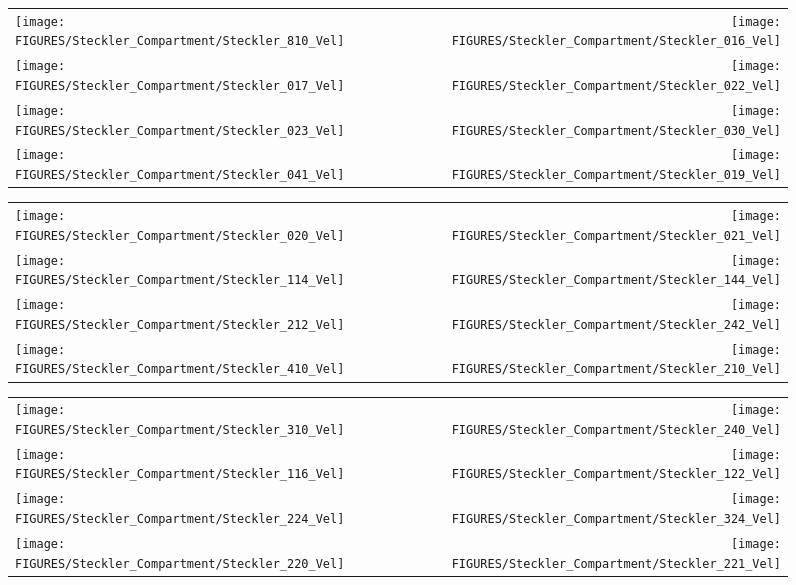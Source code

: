 \begin{figure}[p]
\begin{tabular*}{\textwidth}{l@{\extracolsep{\fill}}r}
\texttt{[image: FIGURES/Steckler\_Compartment/Steckler\_810\_Vel]} &
\texttt{[image: FIGURES/Steckler\_Compartment/Steckler\_016\_Vel]} \\
\texttt{[image: FIGURES/Steckler\_Compartment/Steckler\_017\_Vel]} &
\texttt{[image: FIGURES/Steckler\_Compartment/Steckler\_022\_Vel]} \\
\texttt{[image: FIGURES/Steckler\_Compartment/Steckler\_023\_Vel]} &
\texttt{[image: FIGURES/Steckler\_Compartment/Steckler\_030\_Vel]} \\
\texttt{[image: FIGURES/Steckler\_Compartment/Steckler\_041\_Vel]} &
\texttt{[image: FIGURES/Steckler\_Compartment/Steckler\_019\_Vel]}
\end{tabular*}
\label{Steckler_Vel_2}
\end{figure}

\begin{figure}[p]
\begin{tabular*}{\textwidth}{l@{\extracolsep{\fill}}r}
\texttt{[image: FIGURES/Steckler\_Compartment/Steckler\_020\_Vel]} &
\texttt{[image: FIGURES/Steckler\_Compartment/Steckler\_021\_Vel]} \\
\texttt{[image: FIGURES/Steckler\_Compartment/Steckler\_114\_Vel]} &
\texttt{[image: FIGURES/Steckler\_Compartment/Steckler\_144\_Vel]} \\
\texttt{[image: FIGURES/Steckler\_Compartment/Steckler\_212\_Vel]} &
\texttt{[image: FIGURES/Steckler\_Compartment/Steckler\_242\_Vel]} \\
\texttt{[image: FIGURES/Steckler\_Compartment/Steckler\_410\_Vel]} &
\texttt{[image: FIGURES/Steckler\_Compartment/Steckler\_210\_Vel]}
\end{tabular*}
\label{Steckler_Vel_3}
\end{figure}

\begin{figure}[p]
\begin{tabular*}{\textwidth}{l@{\extracolsep{\fill}}r}
\texttt{[image: FIGURES/Steckler\_Compartment/Steckler\_310\_Vel]} &
\texttt{[image: FIGURES/Steckler\_Compartment/Steckler\_240\_Vel]} \\
\texttt{[image: FIGURES/Steckler\_Compartment/Steckler\_116\_Vel]} &
\texttt{[image: FIGURES/Steckler\_Compartment/Steckler\_122\_Vel]} \\
\texttt{[image: FIGURES/Steckler\_Compartment/Steckler\_224\_Vel]} &
\texttt{[image: FIGURES/Steckler\_Compartment/Steckler\_324\_Vel]} \\
\texttt{[image: FIGURES/Steckler\_Compartment/Steckler\_220\_Vel]} &
\texttt{[image: FIGURES/Steckler\_Compartment/Steckler\_221\_Vel]}
\end{tabular*}
\label{Steckler_Vel_4}
\end{figure}

